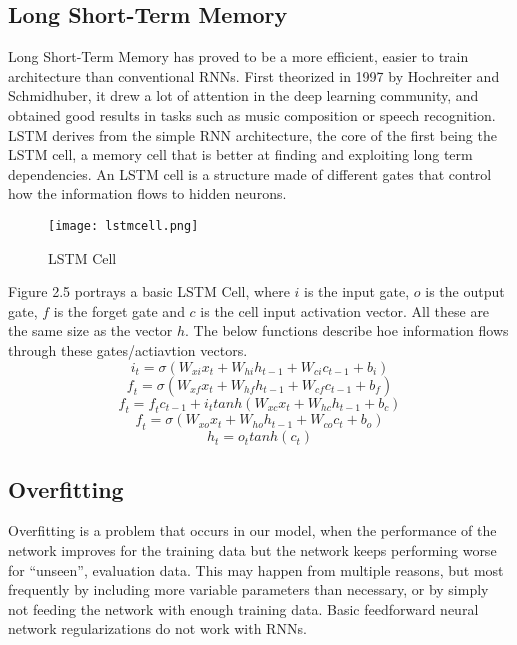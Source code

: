 \documentclass[../Thesis.tex]{subfiles}
\begin{document}
\subsection {Long Short-Term Memory}

Long Short-Term Memory has proved to be a more efficient, easier to train architecture than conventional RNNs. First theorized in 1997 by Hochreiter and Schmidhuber, it drew a lot of attention in the deep learning community, and obtained good results in tasks such as music composition or speech recognition. LSTM derives from the simple RNN architecture, the core of the first being the LSTM cell, a memory cell that is better at finding and exploiting long term dependencies. An LSTM cell is a structure made of different gates that control how the information flows to hidden neurons.


\begin{figure}[h]
\centering
\label {fig: lstmcell}
\texttt{[image: lstmcell.png]}
\caption[width=0.5\textwidth]{LSTM Cell}
\end{figure}

Figure 2.5 portrays a basic LSTM Cell, where $i$ is the input gate, $o$ is the output gate, $f$ is the forget gate and $c$ is the cell input activation vector. All these are the same size as the vector $h$. The below functions describe hoe information flows through these gates/actiavtion vectors.
\[ \mathit{i}_{\mathit{t}} = \sigma (W_{\mathit{xi}} \mathit{x}_\mathit{t} + W_{\mathit{hi}}  \mathit{h}_{\mathit{t} - 1} + W_{\mathit{ci}}  \mathit{c}_{\mathit{t} - 1} + \mathit{b}_\mathit{i}) \]
\[ \mathit{f}_{\mathit{t}} = \sigma (W_{\mathit{xf}} \mathit{x}_\mathit{t} + W_{\mathit{hf}}  \mathit{h}_{\mathit{t} - 1} + W_{\mathit{cf}}  \mathit{c}_{\mathit{t} - 1} + \mathit{b}_\mathit{f}) \]
\[ \mathit{f}_{\mathit{t}} = \mathit{f}_\mathit{t} \mathit{c}_{\mathit{t} - 1} +  \mathit{i}_\mathit{t} tanh (W_{\mathit{xc}} \mathit{x}_\mathit{t} + W_{\mathit{hc}}  \mathit{h}_{\mathit{t} - 1} + \mathit{b}_\mathit{c}) \]
\[ \mathit{f}_{\mathit{t}} = \sigma (W_{\mathit{xo}} \mathit{x}_\mathit{t} + W_{\mathit{ho}}  \mathit{h}_{\mathit{t} - 1} + W_{\mathit{co}}  \mathit{c}_\mathit{t} + \mathit{b}_\mathit{o}) \]
\[ \mathit{h}_\mathit{t} = \mathit{o}_\mathit{t} tanh( \mathit{c}_\mathit{t} ) \]
\subsection {Overfitting}

Overfitting is a problem that occurs in our model, when the performance of the network improves for the training data but the network keeps performing worse for “unseen”, evaluation data. This may happen from multiple reasons, but most frequently by including more variable parameters than necessary, or by simply not feeding the network with enough training data. Basic feedforward neural network regularizations do not work with RNNs.
 
\end{document}
